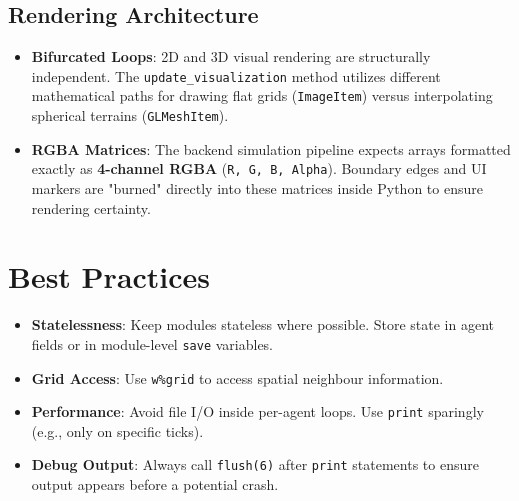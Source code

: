 \subsection{Rendering Architecture}
\begin{itemize}
    \item \textbf{Bifurcated Loops}: 2D and 3D visual rendering are structurally independent. The \texttt{update\_visualization} method utilizes different mathematical paths for drawing flat grids (\texttt{ImageItem}) versus interpolating spherical terrains (\texttt{GLMeshItem}).
    \item \textbf{RGBA Matrices}: The backend simulation pipeline expects arrays formatted exactly as \textbf{4-channel RGBA} (\texttt{R, G, B, Alpha}). Boundary edges and UI markers are "burned" directly into these matrices inside Python to ensure rendering certainty.
\end{itemize}

\section{Best Practices}
\begin{itemize}
    \item \textbf{Statelessness}: Keep modules stateless where possible. Store state in agent fields or in module-level \texttt{save} variables.
    \item \textbf{Grid Access}: Use \texttt{w\%grid} to access spatial neighbour information.
    \item \textbf{Performance}: Avoid file I/O inside per-agent loops. Use \texttt{print} sparingly (e.g., only on specific ticks).
    \item \textbf{Debug Output}: Always call \texttt{flush(6)} after \texttt{print} statements to ensure output appears before a potential crash.
\end{itemize}
